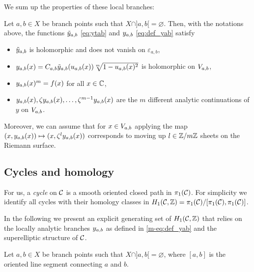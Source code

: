 \documentclass[main.tex]{subfiles}
\begin{document}
We sum up the properties of these local branches:
  
 \begin{prop}\label{prop:yab}
      Let $a,b\in X$ be branch points such that $X\cap]a,b[=\varnothing$.
      Then, with the notations above, the functions
      $\tilde{y}_{a,b}$ \eqref{eq:ytab} and $y_{a,b}$ \eqref{eq:def_yab}
      satisfy
     \begin{itemize}
         \item $\tilde{y}_{a,b}$ is holomorphic and does not vanish on $ε_{a,b}$,
         \item $y_{a,b}(x) = C_{a,b} \tilde{y}_{a,b}(u_{a,b}(x)) \sqrt[m]{1-u_{a,b}(x)^2}$ is holomorphic
         on $V_{a,b}$,
         \item $y_{a,b}(x)^m = f(x)$ for all $x\in\mathbb{C}$,
         \item $y_{a,b}(x),\zeta y_{a,b}(x),\dots,\zeta^{m-1}y_{a,b}(x)$ are the $m$ different analytic continuations of $y$ on $V_{a,b}$.
     \end{itemize}
     Moreover, we can assume that for $x \in V_{a,b}$ applying the map $(x,y_{a,b}(x)) \mapsto (x,\zeta^ly_{a,b}(x))$ corresponds to moving up $l \in \mathbb{Z}/m\mathbb{Z}$ sheets on the Riemann surface.
 \end{prop}

 \subsection{Cycles and homology}\label{subsec:cycles_homo}
   
   For us, a \emph{cycle} on $\mathcal{C}$ is a smooth oriented closed path in $\pi_1(\mathcal{C})$.
   For simplicity we identify all cycles with their homology classes in $H_1(\mathcal{C},\mathbb{Z}) = \pi_1(\mathcal{C})/[\pi_1(\mathcal{C}),\pi_1(\mathcal{C})]$. 
   
   In the following we present an 
   explicit generating set of $H_1(\mathcal{C},\mathbb{Z})$ that relies on the locally analytic branches $y_{a,b}$ as defined in \eqref{m-eq:def_yab} and the superelliptic structure of $\mathcal{C}$.

   Let $a, b \in X$ be branch points such that $X\cap]a,b[=\varnothing$, where  $[a,b]$ is the oriented line segment connecting $a$ and $b$. 
   
\end{document}

